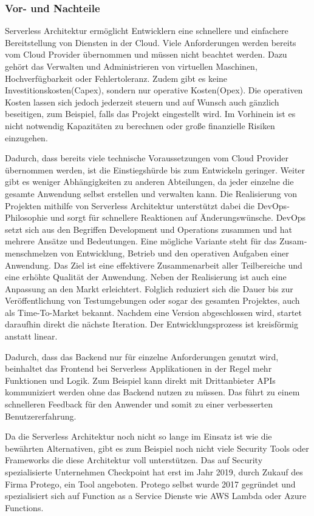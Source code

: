 \subsubsection{Vor- und Nachteile}
Serverless Architektur ermöglicht Entwicklern eine schnellere und einfachere Bereitstellung von Diensten in der Cloud.
Viele Anforderungen werden bereits vom Cloud Provider übernommen und müssen nicht beachtet werden.
Dazu gehört das Verwalten und Administrieren von virtuellen Maschinen, Hochverfügbarkeit oder Fehlertoleranz.
Zudem gibt es keine Investitionskosten(Capex), sondern nur operative Kosten(Opex).
Die operativen Kosten lassen sich jedoch jederzeit steuern und auf Wunsch auch gänzlich beseitigen, zum Beispiel, falls das Projekt eingestellt wird.
Im Vorhinein ist es nicht notwendig Kapazitäten zu berechnen oder große finanzielle Risiken einzugehen.

Dadurch, dass bereits viele technische Voraussetzungen vom Cloud Provider übernommen werden, ist die Einstiegshürde bis zum Entwickeln geringer.
Weiter gibt es weniger Abhängigkeiten zu anderen Abteilungen, da jeder einzelne die gesamte Anwendung selbst erstellen und verwalten kann.
Die Realisierung von Projekten mithilfe von Serverless Architektur unterstützt dabei die DevOps-Philosophie und sorgt für schnellere Reaktionen auf Änderungswünsche.
DevOps setzt sich aus den Begriffen Development und Operations zusammen und hat mehrere Ansätze und Bedeutungen.
Eine mögliche Variante steht für das Zu­sam­men­schmel­zen von Entwicklung, Betrieb und den operativen Aufgaben einer Anwendung.
Das Ziel ist eine effektivere Zusammenarbeit aller Teilbereiche und eine erhöhte Qualität der Anwendung.
Neben der Realisierung ist auch eine Anpassung an den Markt erleichtert.
Folglich reduziert sich die Dauer bis zur Veröffentlichung von Testumgebungen oder sogar des gesamten Projektes, auch als Time-To-Market bekannt.
Nachdem eine Version abgeschlossen wird, startet daraufhin direkt die nächste Iteration.
Der Entwicklungsprozess ist kreisförmig anstatt linear.
\cite[]{DevOps}

Dadurch, dass das Backend nur für einzelne Anforderungen genutzt wird, beinhaltet das Frontend bei Serverless Applikationen in der Regel mehr Funktionen und Logik.
Zum Beispiel kann direkt mit Drittanbieter APIs kommuniziert werden ohne das Backend nutzen zu müssen.
Das führt zu einem schnelleren Feedback für den Anwender und somit zu einer verbesserten Benutzererfahrung.

Da die Serverless Architektur noch nicht so lange im Einsatz ist wie die bewährten Alternativen, gibt es zum Beispiel noch nicht viele Security Tools oder Frameworks die diese Architektur voll unterstützen.
Das auf Security spezialisierte Unternehmen Checkpoint hat erst im Jahr 2019, durch Zukauf des Firma Protego, ein Tool angeboten.
Protego selbst wurde 2017 gegründet und spezialisiert sich auf Function as a Service Dienste wie AWS Lambda oder Azure Functions. \cite[]{Checkpoint}

